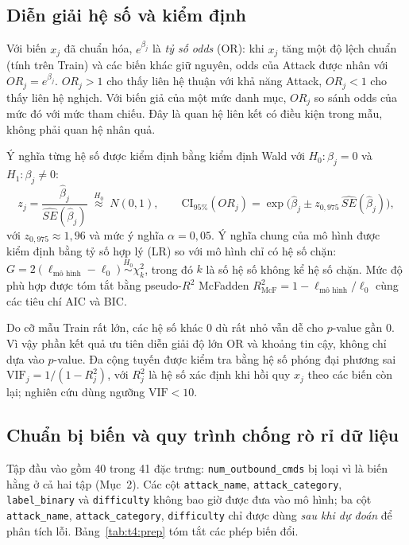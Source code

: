 \subsection{Diễn giải hệ số và kiểm định}
Với biến $x_j$ đã chuẩn hóa, $e^{\beta_j}$ là \emph{tỷ số odds} (OR): khi $x_j$ tăng một độ lệch chuẩn (tính trên Train) và các biến khác giữ nguyên, odds của Attack được nhân với $OR_j=e^{\beta_j}$. $OR_j>1$ cho thấy liên hệ thuận với khả năng Attack, $OR_j<1$ cho thấy liên hệ nghịch. Với biến giả của một mức danh mục, $OR_j$ so sánh odds của mức đó với mức tham chiếu. Đây là quan hệ liên kết có điều kiện trong mẫu, không phải quan hệ nhân quả.

Ý nghĩa từng hệ số được kiểm định bằng kiểm định Wald với $H_0:\beta_j=0$ và $H_1:\beta_j\neq0$:
\begin{equation}
z_j=\frac{\hat\beta_j}{\widehat{SE}(\hat\beta_j)}\;\overset{H_0}{\approx}\;N(0,1),
\qquad
\text{CI}_{95\%}(OR_j)=\exp\!\Big(\hat\beta_j\pm z_{0{,}975}\,\widehat{SE}(\hat\beta_j)\Big),
\label{eq:t4:wald}
\end{equation}
với $z_{0{,}975}\approx1{,}96$ và mức ý nghĩa $\alpha=0{,}05$. Ý nghĩa chung của mô hình được kiểm định bằng tỷ số hợp lý (LR) so với mô hình chỉ có hệ số chặn: $G=2(\ell_{\text{mô hình}}-\ell_0)\overset{H_0}{\sim}\chi^2_{k}$, trong đó $k$ là số hệ số không kể hệ số chặn. Mức độ phù hợp được tóm tắt bằng pseudo-$R^2$ McFadden $R^2_{\text{McF}}=1-\ell_{\text{mô hình}}/\ell_0$ \cite{task4_mcfadden1974} cùng các tiêu chí AIC và BIC.

Do cỡ mẫu Train rất lớn, các hệ số khác 0 dù rất nhỏ vẫn dễ cho $p$-value gần 0. Vì vậy phần kết quả ưu tiên diễn giải độ lớn OR và khoảng tin cậy, không chỉ dựa vào $p$-value. Đa cộng tuyến được kiểm tra bằng hệ số phóng đại phương sai $\mathrm{VIF}_j=1/(1-R_j^2)$, với $R_j^2$ là hệ số xác định khi hồi quy $x_j$ theo các biến còn lại; nghiên cứu dùng ngưỡng $\mathrm{VIF}<10$.

\subsection{Chuẩn bị biến và quy trình chống rò rỉ dữ liệu}
Tập đầu vào gồm 40 trong 41 đặc trưng: \texttt{num\_outbound\_cmds} bị loại vì là biến hằng ở cả hai tập (Mục~2). Các cột \texttt{attack\_name}, \texttt{attack\_category}, \texttt{label\_binary} và \texttt{difficulty} không bao giờ được đưa vào mô hình; ba cột \texttt{attack\_name}, \texttt{attack\_category}, \texttt{difficulty} chỉ được dùng \emph{sau khi dự đoán} để phân tích lỗi. Bảng~\ref{tab:t4:prep} tóm tắt các phép biến đổi.

